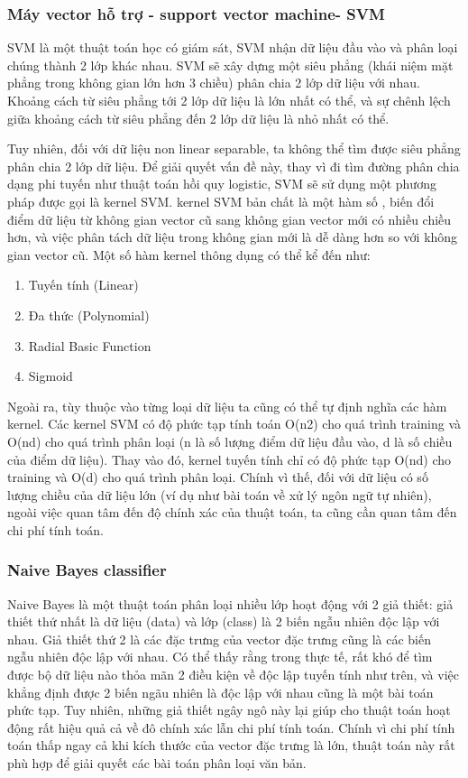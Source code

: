 \documentclass[../DoAn.tex]{subfiles}
\begin{document}
\subsubsection{Máy vector hỗ trợ - support vector machine- SVM}
SVM là một thuật toán học có giám sát, SVM nhận dữ liệu đầu vào và phân loại chúng thành 2 lớp khác nhau. SVM sẽ xây dựng một siêu phẳng (khái niệm mặt phẳng trong không gian lớn hơn 3 chiều) phân chia 2 lớp dữ liệu với nhau. Khoảng cách từ siêu phẳng tới 2 lớp dữ liệu là lớn nhất có thể, và sự chênh lệch giữa khoảng cách từ siêu phẳng đến 2 lớp dữ liệu là nhỏ nhất có thể.

Tuy nhiên, đối với dữ liệu non linear separable, ta không thể tìm được siêu phẳng phân chia 2 lớp dữ liệu. Để giải quyết vấn đề này, thay vì đi tìm đường phân chia dạng phi tuyến như thuật toán hồi quy logistic, SVM sẽ sử dụng một phương pháp được gọi là kernel SVM. kernel SVM bản chất là một hàm số , biến đổi điểm dữ liệu từ không gian vector cũ sang không gian vector mới có nhiều chiều hơn, và việc phân tách dữ liệu trong không gian mới là dễ dàng hơn so với không gian vector cũ. Một số hàm kernel thông dụng có thể kể đến như:
\begin{enumerate}
    \item Tuyến tính (Linear)
    \item Đa thức (Polynomial)
    \item Radial Basic Function
    \item Sigmoid
\end{enumerate}
Ngoài ra, tùy thuộc vào từng loại dữ liệu ta cũng có thể tự định nghĩa các hàm kernel.
Các kernel SVM có độ phức tạp tính toán O(n2) cho quá trình training và O(nd) cho quá trình phân loại (n là số lượng điểm dữ liệu đầu vào, d là số chiều của điểm dữ liệu). Thay vào đó, kernel tuyến tính chỉ có độ phức tạp O(nd) cho training và O(d) cho quá trình phân loại. Chính vì thế, đối với dữ liệu có số lượng chiều của dữ liệu lớn (ví dụ như bài toán về xử lý ngôn ngữ tự nhiên), ngoài việc quan tâm đến độ chính xác của thuật toán, ta cũng cần quan tâm đến chi phí tính toán. 

\subsubsection{Naive Bayes classifier}
Naive Bayes là một thuật toán phân loại nhiều lớp hoạt động với 2 giả thiết: giả thiết thứ nhất là dữ liệu (data) và lớp (class) là 2 biến ngẫu nhiên độc lập với nhau. Giả thiết thứ 2 là các đặc trưng của vector đặc trưng cũng là các biến ngẫu nhiên độc lập với nhau. Có thể thấy rằng trong thực tế, rất khó để tìm được bộ dữ liệu nào thỏa mãn 2 điều kiện về độc lập tuyến tính như trên, và việc khẳng định được 2 biến ngãu nhiên là độc lập với nhau cũng là một bài toán phức tạp. Tuy nhiên, những giả thiết ngây ngô này lại giúp cho thuật toán hoạt động rất hiệu quả cả về đô chính xác lẫn chi phí tính toán. Chính vì chi phí tính toán thấp ngay cả khi kích thước của vector đặc trưng là lớn, thuật toán này rất phù hợp để giải quyết các bài toán phân loại văn bản.
\end{document}
